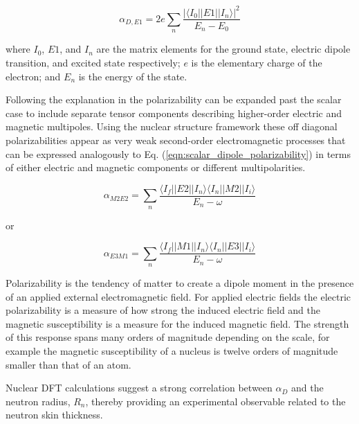 \documentclass[cnatzke_thesis_proposal.tex]{subfiles}
\begin{document}
\begin{equation} \label{eqn:scalar_dipole_polarizability}
    \alpha_{D,E1} = 2 e \sum_n \frac{|\langle I_0 || E1 || I_n \rangle |^2}{E_n - E_0}
\end{equation}

where $I_0$, $E1$, and $I_n$ are the matrix elements for the ground state, electric dipole transition, and excited state respectively; $e$ is the elementary charge of the electron; and $E_n$ is the energy of the state. 

Following the explanation in \cite{soderstrom_electromagnetic_2020} the polarizability can be expanded past the scalar case to include separate tensor components describing higher-order electric and magnetic multipoles. Using the nuclear structure framework these off diagonal polarizabilities appear as very weak second-order electromagnetic processes that can be expressed analogously to Eq. (\ref{eqn:scalar_dipole_polarizability}) in terms of either electric and magnetic components or different multipolarities. 

\begin{equation} \label{eqn:m2e2_dipole_polarizability}
    \alpha_{M2E2} = \sum_n \frac{\langle I_f || E2 || I_n \rangle \langle I_n || M2 || I_i \rangle}{E_n - \omega}
\end{equation}

or 

\begin{equation} \label{eqn:m2e2_dipole_polarizability}
    \alpha_{E3M1} = \sum_n \frac{\langle I_f || M1 || I_n \rangle \langle I_n || E3 || I_i \rangle}{E_n - \omega}
\end{equation}



Polarizability is the tendency of matter to create a dipole moment in the presence of an applied external electromagnetic field. For applied electric fields the electric polarizability is a measure of how strong the induced electric field and the magnetic susceptibility is a measure for the induced magnetic field. \cite{Garg2012} The strength of this response spans many orders of magnitude depending on the scale, for example the magnetic susceptibility of a nucleus is twelve orders of magnitude smaller than that of an atom. \cite{Knupfer1985}

Nuclear DFT calculations suggest a strong correlation between $\alpha_D$ and the neutron radius, $R_{n}$, thereby providing an experimental observable related to the neutron skin thickness.  \cite{Hagen2016}
\end{document}
